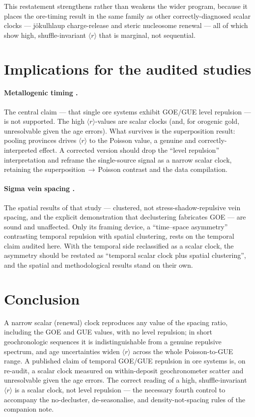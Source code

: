 \documentclass[11pt]{article}
\newcommand{\rr}{\langle r\rangle}
\begin{document}
This restatement strengthens rather than weakens the wider program, because it
places the ore-timing result in the same family as other correctly-diagnosed
scalar clocks --- jökulhlaup charge-release and steric nucleosome renewal
\citep{chen2026nucleosome} --- all of which show high, shuffle-invariant $\rr$ that
is marginal, not sequential.

\section{Implications for the audited studies}

\paragraph{Metallogenic timing \citep{chen2026metallogeny}.} The central claim ---
that single ore systems exhibit GOE/GUE level repulsion --- is not supported. The
high $\rr$-values are scalar clocks (and, for orogenic gold, unresolvable given
the age errors). What survives is the superposition result: pooling provinces
drives $\rr$ to the Poisson value, a genuine and correctly-interpreted effect. A
corrected version should drop the ``level repulsion'' interpretation and reframe
the single-source signal as a narrow scalar clock, retaining the
superposition$\,\to\,$Poisson contrast and the data compilation.

\paragraph{Sigma vein spacing \citep{chen2026sigma}.} The spatial results of that
study --- clustered, not stress-shadow-repulsive vein spacing, and the explicit
demonstration that declustering fabricates GOE --- are sound and unaffected. Only
its framing device, a ``time--space asymmetry'' contrasting temporal repulsion
with spatial clustering, rests on the temporal claim audited here. With the
temporal side reclassified as a scalar clock, the asymmetry should be restated as
``temporal scalar clock plus spatial clustering'', and the spatial and
methodological results stand on their own.

\section{Conclusion}

A narrow scalar (renewal) clock reproduces any value of the spacing ratio,
including the GOE and GUE values, with no level repulsion; in short geochronologic
sequences it is indistinguishable from a genuine repulsive spectrum, and age
uncertainties widen $\rr$ across the whole Poisson-to-GUE range. A published claim
of temporal GOE/GUE repulsion in ore systems is, on re-audit, a scalar clock
measured on within-deposit geochronometer scatter and unresolvable given the age
errors. The correct reading of a high, shuffle-invariant $\rr$ is a scalar clock,
not level repulsion --- the necessary fourth control to accompany the no-decluster,
de-seasonalise, and density-not-spacing rules of the companion note.
\end{document}
